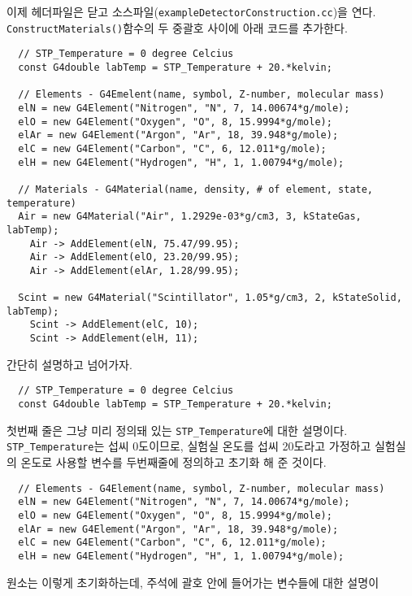 이제 헤더파일은 닫고 소스파일(\texttt{exampleDetectorConstruction.cc})을 연다.
\\ \texttt{ConstructMaterials()}함수의 두 중괄호 사이에 아래 코드를 추가한다.
\begin{pc}
\begin{lstlisting}
  // STP_Temperature = 0 degree Celcius
  const G4double labTemp = STP_Temperature + 20.*kelvin;

  // Elements - G4Emelent(name, symbol, Z-number, molecular mass)
  elN = new G4Element("Nitrogen", "N", 7, 14.00674*g/mole);
  elO = new G4Element("Oxygen", "O", 8, 15.9994*g/mole);
  elAr = new G4Element("Argon", "Ar", 18, 39.948*g/mole);
  elC = new G4Element("Carbon", "C", 6, 12.011*g/mole);
  elH = new G4Element("Hydrogen", "H", 1, 1.00794*g/mole);

  // Materials - G4Material(name, density, # of element, state, temperature)
  Air = new G4Material("Air", 1.2929e-03*g/cm3, 3, kStateGas, labTemp);
    Air -> AddElement(elN, 75.47/99.95); 
    Air -> AddElement(elO, 23.20/99.95); 
    Air -> AddElement(elAr, 1.28/99.95); 

  Scint = new G4Material("Scintillator", 1.05*g/cm3, 2, kStateSolid, labTemp);
    Scint -> AddElement(elC, 10);
    Scint -> AddElement(elH, 11);
\end{lstlisting}
\end{pc}
간단히 설명하고 넘어가자.
\begin{pc}
\begin{lstlisting}
  // STP_Temperature = 0 degree Celcius
  const G4double labTemp = STP_Temperature + 20.*kelvin;
\end{lstlisting}
\end{pc}
첫번째 줄은 그냥 미리 정의돼 있는 \texttt{STP\_Temperature}에 대한 설명이다.
\texttt{STP\_Temperature}는 섭씨 0도이므로, 실험실 온도를 섭씨 20도라고 가정하고
실험실의 온도로 사용할 변수를 두번째줄에 정의하고 초기화 해 준 것이다.
\begin{pc}
\begin{lstlisting}
  // Elements - G4Element(name, symbol, Z-number, molecular mass)
  elN = new G4Element("Nitrogen", "N", 7, 14.00674*g/mole);
  elO = new G4Element("Oxygen", "O", 8, 15.9994*g/mole);
  elAr = new G4Element("Argon", "Ar", 18, 39.948*g/mole);
  elC = new G4Element("Carbon", "C", 6, 12.011*g/mole);
  elH = new G4Element("Hydrogen", "H", 1, 1.00794*g/mole);
\end{lstlisting}
\end{pc}
원소는 이렇게 초기화하는데, 주석에 괄호 안에 들어가는 변수들에 대한 설명이
